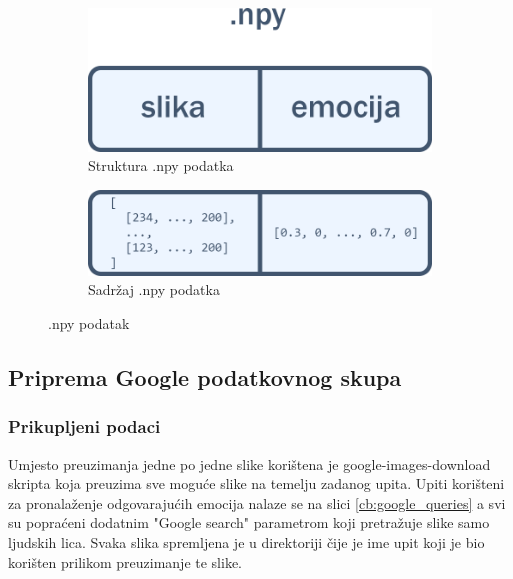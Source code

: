 \documentclass[times, utf8, zavrsni,numeric,pstricks]{fer}
\begin{document}
\begin{figure}[H]
	\centering
	\begin{subfigure}[b]{0.5\linewidth}
	  	\centering
		\includegraphics[width=\linewidth, height=0.3\paperheight, keepaspectratio]{numpy_slika_emocija.png}
		\caption{Struktura .npy podatka}		
	\end{subfigure}
	\begin{subfigure}[b]{0.5\linewidth}
	  	\centering
		\includegraphics[width=\linewidth, height=0.3\paperheight, keepaspectratio]{numpy_imgdata_emo.png}
		\caption{Sadržaj .npy podatka}
	\end{subfigure}	
	\caption{.npy podatak}	
	\label{fig:npy_array}
\end{figure}


\subsection{Priprema Google podatkovnog skupa}\label{priprema_google}
\subsubsection{Prikupljeni podaci}
Umjesto preuzimanja jedne po jedne slike korištena je google-images-download skripta \cite{google-images-download} koja preuzima sve moguće slike na temelju zadanog upita. Upiti korišteni za pronalaženje odgovarajućih emocija nalaze se na slici \ref{cb:google_queries} a svi su popraćeni dodatnim "Google search" parametrom koji pretražuje slike samo ljudskih lica. Svaka slika spremljena je u direktoriji čije je ime upit koji je bio korišten prilikom preuzimanje te slike. 
\end{document}
